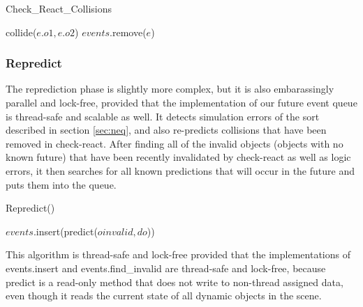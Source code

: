 \documentclass[conference]{IEEEtran}
\begin{document}
\begin{algorithm}
\caption{Check\_React\_Collisions}
\begin{algorithmic}
\STATE {}
	\STATE {}
		\STATE {}
			\STATE {}
			\STATE collide($e.o1,e.o2$)
		\ENDIF
		\STATE {}
		\STATE $events$.remove($e$)
	\ENDIF
\ENDFOR
\end{algorithmic}
\end{algorithm}


\subsubsection{Repredict}
\label{sec:repredict}
The reprediction phase is slightly more complex, but it is also embarassingly parallel and lock-free, provided that the implementation of our future event queue is thread-safe and scalable as well.  It detects simulation errors of the sort described in section \ref{sec:neq}, and also re-predicts collisions
that have been removed in check-react.  After finding all of the invalid objects (objects with no known future) that have been recently invalidated by check-react as well as logic errors, it then
searches for all known predictions that will occur in the future and puts them into the queue.  
\begin{algorithm}
\caption{Repredict()}
\begin{algorithmic}
\STATE {}
	\STATE {}
			\STATE $events$.insert(predict($oinvalid,do$))
		\ENDFOR
	\ENDIF
\ENDFOR
\end{algorithmic}
\end{algorithm}
This algorithm is thread-safe and lock-free provided that the implementations of events.insert and events.find\_invalid are thread-safe and lock-free, because predict is a read-only method that 
does not write to non-thread assigned data, even though it reads the current state of all dynamic objects in the scene.
\end{document}
